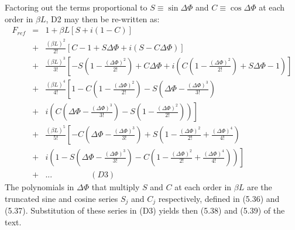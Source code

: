 \documentclass [12pt]{article}
\begin{document}
{  Factoring out
  the terms proportional to $S \equiv \sin \Delta \Phi$ and $C \equiv \cos \Delta \Phi$ at each order in $\beta L$,
  D2 may then be re-written as:
  \begin{eqnarray}
 F_{ref} & = & 1+\beta L [S +i(1-C)] \nonumber \\
      & + & \frac{(\beta L)^2}{2!} \left[C-1+S\Delta \Phi+i(S-C \Delta \Phi)\right] \nonumber \\
      & + &  \frac{(\beta L)^3}{3!} \left[-S(1-\frac{(\Delta \Phi)^2}{2!})+C\Delta \Phi 
             +i\left(C(1-\frac{(\Delta \Phi)^2}{2!})+S\Delta \Phi-1\right)\right]   \nonumber \\
      & + &  \frac{(\beta L)^4}{4!}\left[1-C(1-\frac{(\Delta \Phi)^2}{2!})-S(\Delta \Phi-\frac{(\Delta \Phi)^3}{3!})
               \right.  \nonumber \\
      & + & \left. i \left(C(\Delta \Phi-\frac{(\Delta \Phi)^3}{3!})-S(1-\frac{(\Delta \Phi)^2}{2!})\right) \right] \nonumber \\
     & + &  \frac{(\beta L)^5}{5!}\left[-C(\Delta \Phi-\frac{(\Delta \Phi)^3}{3!})+S(1-\frac{(\Delta \Phi)^2}{2!}
     + \frac{(\Delta \Phi)^4}{4!}) \right.  \nonumber \\
      & + & \left. i \left(1-S(\Delta \Phi-\frac{(\Delta \Phi)^3}{3!})-C(1-\frac{(\Delta \Phi)^2}{2!}
      + \frac{(\Delta \Phi)^4}{4!})\right)\right]  \nonumber \\
     & + &... \nonumber ~~~~~~~~~~~~~~~~~~~~~(D3)
 \end{eqnarray}
  The polynomials in $\Delta \Phi$ that multiply $S$ and
    $C$ at each order in $\beta L$ are the truncated sine and cosine series
    $S_j$ and $C_j$ respectively, defined in (5.36) and (5.37).
    Substitution of these series in (D3) yields then (5.38) and (5.39) of the text.

 \newpage
}
\end{document}
